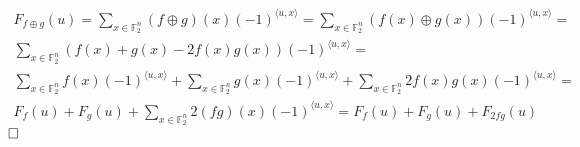 \documentclass[12pt, a4paper]{article}
\newcommand{\qed}{\hfill\square}
\begin{document}
\section{}
\begin{gather*}
F_{f \oplus g}(u) = \sum\limits_{x \in \mathbb{F}^n_2}(f \oplus g)(x)(-1)^{\langle u,x \rangle} = \sum\limits_{x \in \mathbb{F}^n_2}(f(x) \oplus g(x))(-1)^{\langle u,x \rangle} = \\
\sum\limits_{x \in \mathbb{F}^n_2}(f(x) + g(x) - 2f(x)g(x))(-1)^{\langle u,x \rangle} = \\
\sum\limits_{x \in \mathbb{F}^n_2}f(x)(-1)^{\langle u,x \rangle} + \sum\limits_{x \in \mathbb{F}^n_2}g(x)(-1)^{\langle u,x \rangle} + \sum\limits_{x \in \mathbb{F}^n_2}2f(x)g(x)(-1)^{\langle u,x \rangle} = \\
F_f(u) + F_g(u) + \sum\limits_{x \in \mathbb{F}^n_2}2(fg)(x)(-1)^{\langle u,x \rangle} = F_f(u) + F_g(u) + F_{2fg}(u)
\end{gather*}
$\qed$

\section{}
\end{document}
